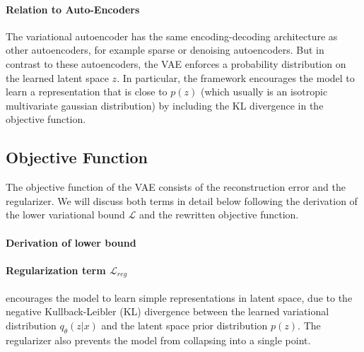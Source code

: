 \paragraph{Relation to Auto-Encoders}
The variational autoencoder has the same encoding-decoding architecture as other autoencoders, for example sparse or denoising autoencoders.
But in contrast to these autoencoders, the VAE enforces a probability distribution on the learned latent space $z$.
In particular, the framework encourages the model to learn a representation that is close to $p(z)$ (which usually is an isotropic multivariate gaussian distribution) by including the KL divergence in the objective function.



\subsection{Objective Function}
The objective function of the VAE consists of the reconstruction error and the regularizer.
We will discuss both terms in detail below following the derivation of the lower variational bound $\mathcal{L}$ and the rewritten objective function.

\paragraph{Derivation of lower bound}


\paragraph{Regularization term $\mathcal{L}_{reg}$} encourages the model to learn simple representations in latent space, due to the negative Kullback-Leibler (KL) divergence between the learned variational distribution $q_\theta(z|x)$ and the latent space prior distribution $p(z)$.
The regularizer also prevents the model from collapsing into a single point.

